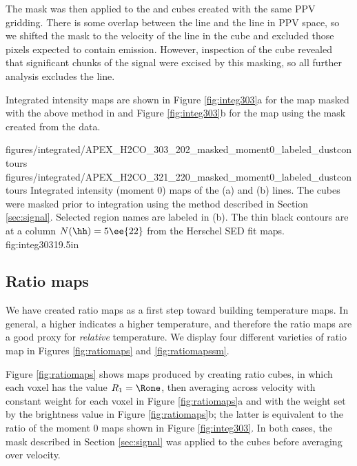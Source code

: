 The \para \threeohthree mask was then applied to the \threetwoone and
\threetwotwo cubes created with the same PPV gridding.  There is some overlap
between the \methanol \fourtwotwo line and the \para \threetwotwo line in PPV
space, so we shifted the \para \threeohthree mask to the velocity of the
\methanol line in the \para \threetwotwo cube and excluded those pixels expected
to contain \methanol emission.
However, inspection of the \threetwotwo cube revealed that significant chunks
of the \threetwotwo signal were excised by this masking, so all further
analysis excludes the \threetwotwo line.

Integrated intensity maps are shown in Figure
\ref{fig:integ303}a for the \threeohthree map masked with the above method
in and Figure \ref{fig:integ303}b for the \threetwoone map
using the mask created from the \threeohthree data.


\RotFigureTwoAA
{figures/integrated/APEX_H2CO_303_202_masked_moment0_labeled_dustcontours}
{figures/integrated/APEX_H2CO_321_220_masked_moment0_labeled_dustcontours}
{Integrated intensity (moment 0) maps of the (a) \para \threeohthree and (b)
\threetwoone lines.  The cubes were masked prior to integration using the
method described in Section \ref{sec:signal}.  Selected region names are
labeled in (b).  
 The thin black contours are at a column $N(\hh)=5\ee{22}$
\percc from the Herschel SED fit maps.
}
{fig:integ303}{1}{9.5in}

\subsection{Ratio maps}
\label{sec:ratio}
We have created \Rone ratio maps as a first step toward building temperature
maps.  In general, a higher \Rone indicates a higher temperature, and therefore
the ratio maps are a good proxy for \emph{relative} temperature.  We display
four different varieties of ratio map in Figures \ref{fig:ratiomaps} and
\ref{fig:ratiomapssm}.

Figure \ref{fig:ratiomaps} shows maps produced by creating ratio cubes, in which
each voxel has the value $R_1=\Rone$, then averaging across velocity with
constant weight for each voxel in Figure \ref{fig:ratiomaps}a and with the weight
set by the \threeohthree brightness value in Figure \ref{fig:ratiomaps}b; the latter is
equivalent to the ratio of the moment 0 maps shown in Figure
\ref{fig:integ303}.  In both
cases, the mask described in Section \ref{sec:signal} was applied to the cubes
before averaging over velocity.



